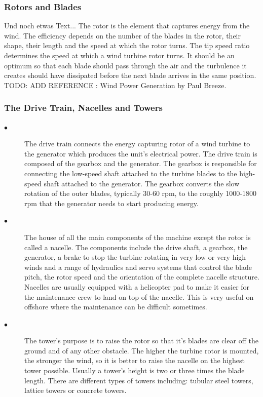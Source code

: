 \documentclass[twosided,a4,10pt]{article}
\begin{document}
\begin{multicols}{2}
 \subsubsection{Rotors and Blades}
 Und noch etwas Text... \cite{muster} \newline
 The rotor is the element that captures energy from the wind. The efficiency depends on the number of the blades in the rotor, their shape, their length and the speed at which the rotor turns. The tip speed ratio determines the speed at which a wind turbine rotor turns. It should be an optimum so that each blade should pass through the air and the turbulence it creates should have dissipated before the next blade arrives in the same position.
 TODO: ADD REFERENCE : Wind Power Generation by Paul Breeze.
\subsubsection{The Drive Train, Nacelles and Towers}
\begin{description}
\item[$\bullet$] 
The drive train connects the energy capturing rotor of a wind turbine to the generator which produces the unit's electrical power. The drive train is composed of the gearbox and the generator. The gearbox is responsible for connecting the low-speed shaft attached to the turbine blades to the high-speed shaft attached to the generator. The gearbox converts the slow rotation of the outer blades, typically 30-60 rpm, to the roughly 1000-1800 rpm that the generator needs to start producing energy.
\item[$\bullet$] 
The house of all the main components of the machine except the rotor is called a nacelle. The components include the drive shaft, a gearbox, the generator, a brake to stop the turbine rotating in very low or very high winds and a range of hydraulics and servo systems that control the blade pitch, the rotor speed and the orientation of the complete nacelle structure. Nacelles are usually equipped with a helicopter pad to make it easier for the maintenance crew to land on top of the nacelle. This is very useful on offshore where the maintenance can be difficult sometimes. 
\item[$\bullet$] 
The tower's purpose is to raise the rotor so that it's blades are clear off the ground and of any other obstacle. The higher the turbine rotor is mounted, the stronger the wind, so it is better to raise the nacelle on the highest tower possible. Usually a tower's height is two or three times the blade length. There are different types of towers including: tubular steel towers, lattice towers or concrete towers.


\end{description}
\end{multicols}
\end{document}
